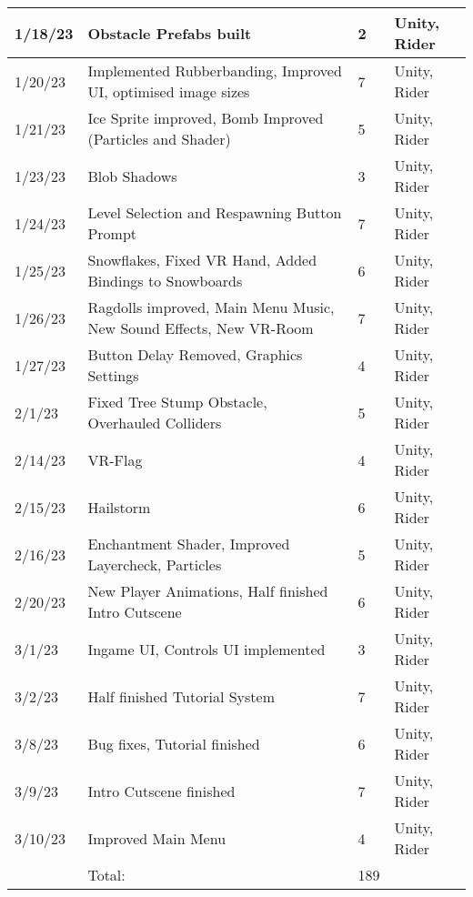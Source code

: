 \begin{longtable}{|p{1.5cm}|p{6cm}|p{1.2cm}|p{2.7cm}|}
	1/18/23 & Obstacle Prefabs built & 2 & Unity, Rider \\ \hline
	1/20/23 & Implemented Rubberbanding, Improved UI, optimised image sizes & 7 & Unity, Rider \\ \hline
	1/21/23 & Ice Sprite improved, Bomb Improved (Particles and Shader) & 5 & Unity, Rider \\ \hline
	1/23/23 & Blob Shadows & 3 & Unity, Rider \\ \hline
	1/24/23 & Level Selection and Respawning Button Prompt & 7 & Unity, Rider \\ \hline
	1/25/23 & Snowflakes, Fixed VR Hand, Added Bindings to Snowboards & 6 & Unity, Rider \\ \hline
	1/26/23 & Ragdolls improved, Main Menu Music, New Sound Effects, New VR-Room & 7 & Unity, Rider \\ \hline
	1/27/23 & Button Delay Removed, Graphics Settings & 4 & Unity, Rider \\ \hline
	2/1/23 & Fixed Tree Stump Obstacle, Overhauled Colliders & 5 & Unity, Rider \\ \hline
	2/14/23 & VR-Flag & 4 & Unity, Rider \\ \hline
	2/15/23 & Hailstorm & 6 & Unity, Rider \\ \hline
	2/16/23 & Enchantment Shader, Improved Layercheck, Particles & 5 & Unity, Rider \\ \hline
	2/20/23 & New Player Animations, Half finished Intro Cutscene & 6 & Unity, Rider \\ \hline
	3/1/23 & Ingame UI, Controls UI implemented & 3 & Unity, Rider \\ \hline
	3/2/23 & Half finished Tutorial System & 7 & Unity, Rider \\ \hline
	3/8/23 & Bug fixes, Tutorial finished & 6 & Unity, Rider \\ \hline
	3/9/23 & Intro Cutscene finished & 7 & Unity, Rider \\ \hline
	3/10/23 & Improved Main Menu & 4 & Unity, Rider \\ \hline
	~ & Total: & 189 & ~ \\ \hline
\end{longtable}